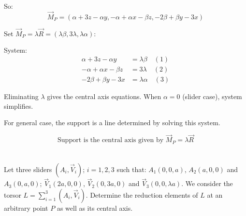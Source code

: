 \documentclass[12pt]{article}
\begin{document}
\begin{correctionbox}
So:
\[
\vec{M}_P = (\alpha + 3z - \alpha y, -\alpha + \alpha x - \beta z, -2\beta + \beta y - 3x)
\]

Set $\vec{M}_P = \lambda \vec{R} = (\lambda\beta, 3\lambda, \lambda\alpha)$:

System:
\begin{align*}
\alpha + 3z - \alpha y &= \lambda\beta \quad (1) \\
-\alpha + \alpha x - \beta z &= 3\lambda \quad (2) \\
-2\beta + \beta y - 3x &= \lambda\alpha \quad (3)
\end{align*}

Eliminating $\lambda$ gives the central axis equations. When $\alpha = 0$ (slider case), system simplifies.

For general case, the support is a line determined by solving this system.

\[
\boxed{\text{Support is the central axis given by } \vec{M}_P = \lambda \vec{R}}
\]
\end{correctionbox}

\section{}

Let three sliders $(A_i, \vec{V}_i)$; $i = 1, 2, 3$ such that: $A_1(0, 0, a)$, $A_2(a, 0, 0)$ and $A_3(0, a, 0)$; $\vec{V}_1(2a, 0, 0)$, $\vec{V}_2(0, 3a, 0)$ and $\vec{V}_3(0, 0, \lambda a)$. We consider the torsor $L = \sum_{i=1}^{3} (A_i, \vec{V}_i)$. Determine the reduction elements of $L$ at an arbitrary point $P$ as well as its central axis.
\end{document}
